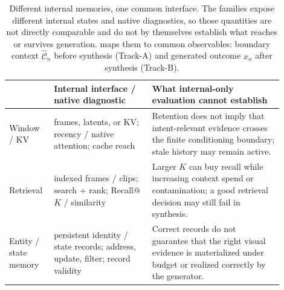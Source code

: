 \begin{table}[!t]
\centering
\caption{{\normalfont Different internal memories, one common interface.}
The families expose different internal states and native diagnostics, so those quantities are not directly comparable and do not by themselves establish what reaches or survives generation. \bench{} maps them to common observables: boundary context $\widehat{\mathcal{C}}_n$ before synthesis (Track-A) and generated outcome $x_n$ after synthesis (Track-B).}
\label{tab:memory-interfaces}
\footnotesize
\setlength{\tabcolsep}{3pt}
\renewcommand{\arraystretch}{1.08}
\begin{tabular}{@{}
  >{\raggedright\arraybackslash}p{0.13\linewidth}
  >{\raggedright\arraybackslash}p{0.33\linewidth}
  >{\raggedright\arraybackslash}p{0.44\linewidth}
  @{} }
\toprule
{\normalfont\bfseries Memory family}
  & {\normalfont\bfseries Internal interface / native diagnostic}
  & {\normalfont\bfseries What internal-only evaluation cannot establish} \\
\midrule
Window / KV
  & frames, latents, or KV; recency / native attention; cache reach
  & Retention does not imply that intent-relevant evidence crosses the finite conditioning boundary; stale history may remain active. \\
Retrieval
  & indexed frames / clips; search $+$ rank; Recall@$K$ / similarity
  & Larger $K$ can buy recall while increasing context spend or contamination; a good retrieval decision may still fail in synthesis. \\
Entity / state memory
  & persistent identity / state records; address, update, filter; record validity
  & Correct records do not guarantee that the right visual evidence is materialized under budget or realized correctly by the generator. \\
\bottomrule
\end{tabular}
\end{table}
